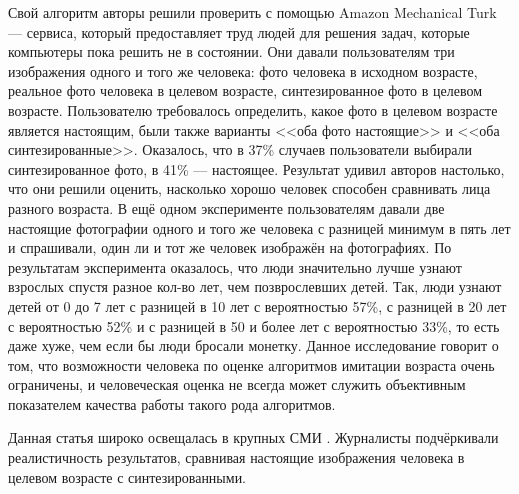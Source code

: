 Свой алгоритм авторы решили проверить с помощью Amazon Mechanical Turk --- сервиса, который предоставляет труд людей для решения задач, которые компьютеры пока решить не в состоянии. Они давали пользователям три изображения одного и того же человека: фото человека в исходном возрасте, реальное фото человека в целевом возрасте, синтезированное фото в целевом возрасте. Пользователю требовалось определить, какое фото в целевом возрасте является настоящим, были также варианты <<оба фото настоящие>> и <<оба синтезированные>>. Оказалось, что в 37\% случаев пользователи выбирали синтезированное фото, в 41\% --- настоящее. Результат удивил авторов настолько, что они решили оценить, насколько хорошо человек способен сравнивать лица разного возраста. В ещё одном эксперименте пользователям давали две настоящие фотографии одного и того же человека с разницей минимум в пять лет и спрашивали, один ли и тот же человек изображён на фотографиях. По результатам эксперимента оказалось, что люди значительно лучше узнают взрослых спустя разное кол-во лет, чем позврослевших детей. Так, люди узнают детей от 0 до 7 лет с разницей в 10 лет с вероятностью 57\%, с разницей в 20 лет с вероятностью 52\% и с разницей в 50 и более лет с вероятностью 33\%, то есть даже хуже, чем если бы люди бросали монетку. Данное исследование говорит о том, что возможности человека по оценке алгоритмов имитации возраста очень ограничены, и человеческая оценка не всегда может служить объективным показателем качества работы такого рода алгоритмов.

Данная статья широко освещалась в крупных СМИ \cite{wired_age} \cite{telegraph_age} \cite{today_age}. Журналисты подчёркивали реалистичность результатов, сравнивая настоящие изображения человека в целевом возрасте с синтезированными.